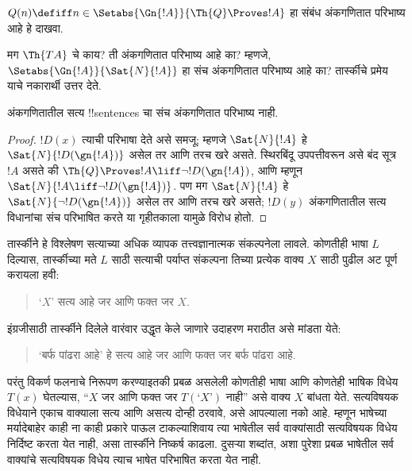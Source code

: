 \documentclass[../../../include/open-logic-section]{subfiles}
\begin{document}
\begin{prob}
$Q(n) \defiff n \in \Setabs{\Gn{!A}}{\Th{Q} \Proves !A}$
हा संबंध अंकगणितात
परिभाष्य आहे
हे दाखवा.
\end{prob}

मग $\Th{TA}$
चे काय? ती
अंकगणितात परिभाष्य
आहे का? म्हणजे,
$\Setabs{\Gn{!A}}{\Sat{N}{!A}}$
हा संच अंकगणितात
परिभाष्य आहे
का? तार्स्कीचे
प्रमेय याचे
नकारार्थी उत्तर
देते.

\begin{thm}
अंकगणितातील सत्य
!!{sentence}s चा संच
अंकगणितात परिभाष्य
नाही.
\end{thm}

\begin{proof}
$!D(x)$ त्याची
परिभाषा देते असे
समजू; म्हणजे
$\Sat{N}{!A}$ हे
$\Sat{N}{!D(\gn{!A})}$
असेल तर आणि
तरच खरे असते.
स्थिरबिंदू उपपत्तीवरून
असे बंद सूत्र $!A$
असते की
$\Th{Q} \Proves !A \liff \lnot !D(\gn{!A})$,
आणि म्हणून
$\Sat{N}{!A \liff \lnot !D(\gn{!A})}$.
पण मग
$\Sat{N}{!A}$ हे
$\Sat{N}{\lnot !D(\gn{!A})}$
असेल तर आणि
तरच खरे असते;
$!D(y)$ अंकगणितातील
सत्य विधानांचा
संच परिभाषित करते
या गृहीतकाला यामुळे
विरोध होतो.
\end{proof}

तार्स्कीने हे
विश्लेषण सत्याच्या
अधिक व्यापक
तत्त्वज्ञानात्मक
संकल्पनेला लावले.
कोणतीही भाषा $L$
दिल्यास, तार्स्कीच्या
मते $L$ साठी
सत्याची पर्याप्त
संकल्पना तिच्या
प्रत्येक वाक्य
$X$ साठी पुढील
अट पूर्ण करायला
हवी:
\begin{quote}
‘$X$’ सत्य आहे
जर आणि फक्त जर
$X$.
\end{quote}
इंग्रजीसाठी
तार्स्कीने दिलेले
वारंवार उद्धृत
केले जाणारे
उदाहरण मराठीत
असे मांडता येते:
\begin{quote}
‘बर्फ पांढरा आहे’
हे सत्य आहे
जर आणि फक्त जर
बर्फ पांढरा आहे.
\end{quote}
परंतु विकर्ण
फलनाचे निरूपण
करण्याइतकी प्रबळ
असलेली कोणतीही
भाषा आणि कोणतेही
भाषिक विधेय $T(x)$
घेतल्यास, “$X$
जर आणि फक्त जर
$T(\text{‘$X$’})$
नाही” असे
वाक्य $X$
बांधता येते.
सत्यविषयक विधेयाने
एकाच वाक्याला
सत्य आणि असत्य
दोन्ही ठरवावे,
असे आपल्याला
नको आहे.
म्हणून भाषेच्या
मर्यादेबाहेर
काही ना काही
प्रकारे पाऊल
टाकल्याशिवाय
त्या भाषेतील
सर्व वाक्यांसाठी
सत्यविषयक विधेय
निर्दिष्ट करता
येत नाही,
असा तार्स्कीने
निष्कर्ष काढला.
दुसऱ्या शब्दांत,
अशा पुरेशा प्रबळ भाषेतील
सर्व वाक्यांचे सत्यविषयक विधेय
त्याच भाषेत
परिभाषित करता
येत नाही.
\end{document}
